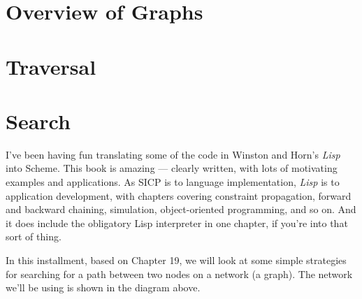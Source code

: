 \documentclass[12pt,openright,draft]{book}
\begin{document}
\section{Overview of Graphs}










\section{Traversal}


\section{Search}


I've been having fun translating some of the code in Winston and
Horn's \emph{Lisp} into Scheme.  This book is amazing --- clearly
written, with lots of motivating examples and applications.  As SICP
is to language implementation, \emph{Lisp} is to application
development, with chapters covering constraint propagation, forward
and backward chaining, simulation, object-oriented programming, and so
on.  And it does include the obligatory Lisp interpreter in one
chapter, if you're into that sort of thing.

In this installment, based on Chapter 19, we will look at some
simple strategies for searching for a path between two nodes on a
network (a graph).  The network we'll be using is shown in the
diagram above.
\end{document}
